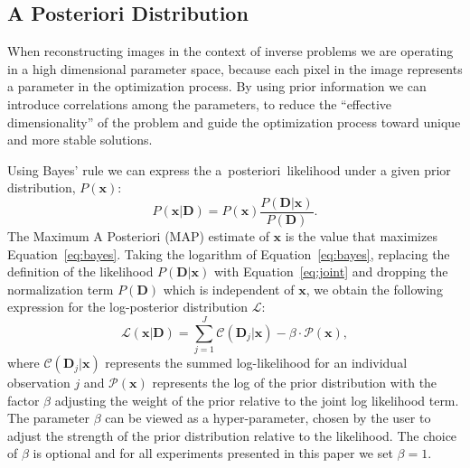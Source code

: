 \documentclass[twocolumn, lineno]{aastex631}
\newcommand{\aposteriori}{a~posteriori~}
\begin{document}
    \subsection{A Posteriori Distribution}
    When reconstructing images in the context of inverse problems we are operating in a high dimensional parameter space, because each pixel in the image represents a parameter in the optimization process. By using prior information we can introduce correlations among the parameters, to reduce the \enquote{effective dimensionality} of the problem and guide the optimization process toward unique and more stable solutions.
    
    Using Bayes' rule we can express the \aposteriori likelihood under a given prior distribution, $P(\mathbf{x} )$:
    \begin{equation}
        \label{eq:bayes}
        P(\mathbf{x}|\textbf{D}) = P(\mathbf{x} ) \frac{P(\textbf{D} |\mathbf{x})}{P(\textbf{D})}.
    \end{equation}
    The Maximum A Posteriori (MAP) estimate of $\mathbf{x}$ is the value that maximizes Equation~\ref{eq:bayes}.
    Taking the logarithm of Equation~\ref{eq:bayes}, replacing the definition of the likelihood $P(\mathbf{D}|\mathbf{x})$ with Equation~\ref{eq:joint} and dropping the normalization term $P(\mathbf{D})$ which is independent of $\mathbf{x}$, we obtain the following expression for the log-posterior distribution
    $\mathcal{L}$:
    \begin{equation}
        \label{eq:total}
        \mathcal{L}\left(\mathbf{x} | \mathbf{D} \right) = \sum_{j=1}^J \mathcal{C}\left( \mathbf{D}_j | \mathbf{x} \right) - \beta \cdot \mathcal{P}(\mathbf{x}),
    \end{equation}
    where $\mathcal{C}\left( \mathbf{D}_j | \mathbf{x} \right)$ represents the summed log-likelihood for an individual observation $j$ and $\mathcal{P}(\mathbf{x})$ represents the log of the prior distribution with the factor $\beta$ adjusting the weight of the prior relative to the joint log likelihood term. The parameter $\beta$ can be viewed as a hyper-parameter, chosen by the user to adjust the strength of the prior distribution relative to the likelihood. The choice of $\beta$ is optional and for all experiments presented in this paper we set $\beta=1$. 

\end{document}

